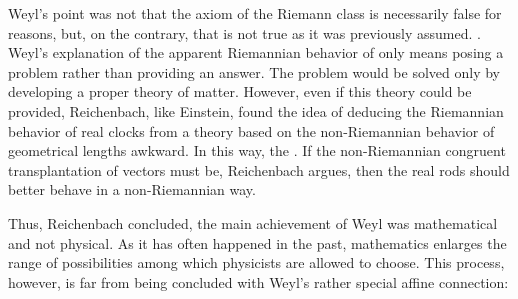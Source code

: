 \documentclass[draft]{article}
\begin{document}
Weyl's point was not that the axiom of the Riemann class is necessarily false for \apr reasons, but, on the contrary, that is not \apr true as it was previously assumed. . Weyl's explanation of the apparent Riemannian behavior of   \citep[368]{Reichenbach1922a} only means posing a problem rather than providing an answer. The problem would be solved only by developing a proper theory of matter. However, even if this theory could be provided, Reichenbach, like Einstein, found the idea of deducing the Riemannian behavior of real clocks from a theory based on the non-Riemannian behavior of geometrical lengths awkward. In this way, the   \citep[368]{Reichenbach1922a}. If the non-Riemannian congruent transplantation of vectors must be, Reichenbach argues, then the real rods should better behave in a non-Riemannian way.

Thus, Reichenbach concluded, the main achievement of Weyl was mathematical and not physical. As it has often happened in the past, mathematics enlarges the range of possibilities among which physicists are allowed to choose. This process, however, is  far from being concluded with Weyl's rather special affine connection:
\end{document}
